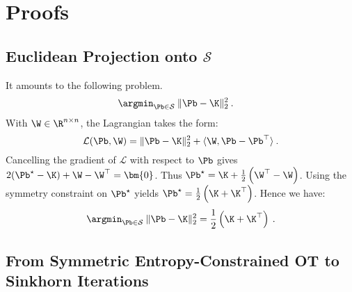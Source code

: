 
\section{Proofs}\label{sec:proofs}

\subsection{Euclidean Projection onto $\mathcal{S}$}\label{sec:sym_proj}

It amounts to the following problem.
\begin{align}
    \argmin_{\Pb \in \mathcal{S}} \: &\| \Pb - \K \|_2^2 \:.
\end{align}
With $\W \in \R^{n \times n}$, the Lagrangian takes the form: 
\begin{equation}
\mathcal{L}(\Pb, \W) = \| \Pb - \K \|_2^2 +\langle \W, \Pb -\Pb^{\top} \rangle \:.
\end{equation}
Cancelling the gradient of $\mathcal{L}$ with respect to $\Pb$ gives $2(\Pb^\star - \K) + \W - \W^\top = \bm{0}$. Thus $\Pb^\star = \K + \frac{1}{2} \left(\W^\top - \W \right)$. Using the symmetry constraint on $\Pb^\star$ yields $\Pb^\star = \frac{1}{2} \left(\K + \K^\top \right)$.
Hence we have:
\begin{equation}
\argmin_{\Pb \in \mathcal{S}} \: \| \Pb -  \K \|_2^2 = \frac{1}{2} \left(\K + \K^\top \right) \:.
\end{equation}

\subsection{From Symmetric Entropy-Constrained OT to Sinkhorn Iterations}\label{sec:proof_sinkhorn}

